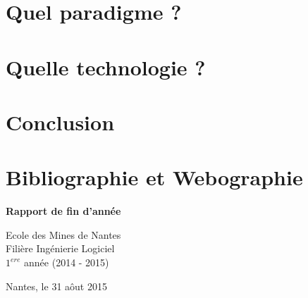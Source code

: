 \documentclass[twoside, 12pt]{report}
\begin{document}
    	\section{Quel paradigme ?}
    		
        
        \section{Quelle technologie ?}
    		

\cleardoublepage
\vfill

\section*{\textbf{Conclusion}}
\label{sect:Conclusion}


\cleardoublepage
\label{sect:Glossaire}
\printglossaries

\cleardoublepage
\section*{\textbf{Bibliographie et Webographie}}
\label{sect:Webographie}


\cleardoublepage
\label{sect:Table des figures}
\listoffigures

\clearpage
  \begin{sffamily}
		\begin{center}
			\vfill
				{ \huge \bfseries Rapport de fin d'année }
			\vfill
			\begin{minipage}{0.8\textwidth}
				\begin{center} \large
					Ecole des Mines de Nantes\\
					Filière Ingénierie Logiciel\\
					$1^{ere}$ année (2014 - 2015)\\
				\end{center}
			\end{minipage}
			\vfill
			{\large Nantes, le 31 aôut 2015}
		\end{center}
	\end{sffamily}
\end{document}
